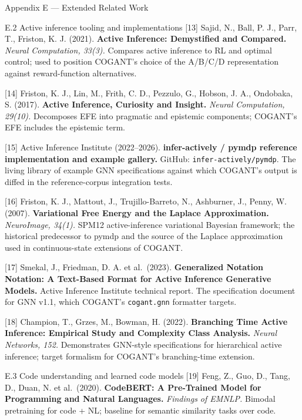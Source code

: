 \documentclass[
  ignorenonframetext,
]{beamer}
\begin{document}
\begin{frame}[fragile]{Appendix E --- Extended Related Work}
\begin{block}{E.2 Active inference tooling and implementations}
{[}13{]} Sajid, N., Ball, P. J., Parr, T., Friston, K. J. (2021).
\textbf{Active Inference: Demystified and Compared.} \emph{Neural
Computation, 33(3).} Compares active inference to RL and optimal
control; used to position COGANT's choice of the A/B/C/D representation
against reward-function alternatives.

{[}14{]} Friston, K. J., Lin, M., Frith, C. D., Pezzulo, G., Hobson, J.
A., Ondobaka, S. (2017). \textbf{Active Inference, Curiosity and
Insight.} \emph{Neural Computation, 29(10).} Decomposes EFE into
pragmatic and epistemic components; COGANT's EFE includes the epistemic
term.

{[}15{]} Active Inference Institute (2022--2026). \textbf{infer-actively
/ pymdp reference implementation and example gallery.} GitHub:
\texttt{infer-actively/pymdp}. The living library of example GNN
specifications against which COGANT's output is diffed in the
reference-corpus integration tests.

{[}16{]} Friston, K. J., Mattout, J., Trujillo-Barreto, N., Ashburner,
J., Penny, W. (2007). \textbf{Variational Free Energy and the Laplace
Approximation.} \emph{NeuroImage, 34(1).} SPM12 active-inference
variational Bayesian framework; the historical predecessor to pymdp and
the source of the Laplace approximation used in continuous-state
extensions of COGANT.

{[}17{]} Smekal, J., Friedman, D. A. et al.~(2023). \textbf{Generalized
Notation Notation: A Text-Based Format for Active Inference Generative
Models.} Active Inference Institute technical report. The specification
document for GNN v1.1, which COGANT's \texttt{cogant.gnn} formatter
targets.

{[}18{]} Champion, T., Grzes, M., Bowman, H. (2022). \textbf{Branching
Time Active Inference: Empirical Study and Complexity Class Analysis.}
\emph{Neural Networks, 152.} Demonstrates GNN-style specifications for
hierarchical active inference; target formalism for COGANT's
branching-time extension.
\end{block}

\begin{block}{E.3 Code understanding and learned code models}
\protect{}\label{e.3-code-understanding-and-learned-code-models}
{[}19{]} Feng, Z., Guo, D., Tang, D., Duan, N. et al.~(2020).
\textbf{CodeBERT: A Pre-Trained Model for Programming and Natural
Languages.} \emph{Findings of EMNLP.} Bimodal pretraining for code + NL;
baseline for semantic similarity tasks over code.


\end{block}
\end{frame}
\end{document}

